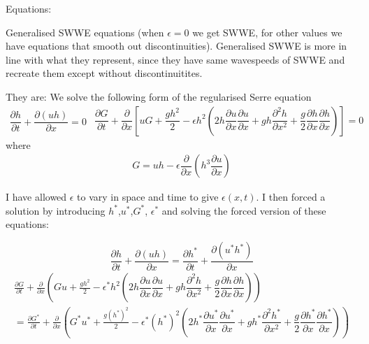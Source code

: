 \documentclass[10pt]{article}
\begin{document}
	Equations:
	
	Generalised SWWE equations (when $\epsilon = 0$ we get SWWE, for other values we have equations that smooth out discontinuities). Generalised SWWE is more in line with what they represent, since they have same wavespeeds of SWWE and recreate them except without discontinuitites.
	
	They are:
We solve the following form of the regularised Serre equation
\begin{subequations}
	\begin{gather}
	\dfrac{\partial h}{\partial t} + \dfrac{\partial (uh)}{\partial x} = 0
	\label{eq:gSV_Ga}
	\end{gather}
	\begin{gather}
	\dfrac{\partial G}{\partial t} + \dfrac{\partial }{\partial x} \left[ uG + \dfrac{gh^2}{2} - \epsilon h^2\left ( 2 h \dfrac{\partial u}{\partial x} \dfrac{\partial u}{\partial x} + gh \dfrac{\partial^2h}{\partial x^2} +\dfrac{g}{2} \dfrac{\partial h}{\partial x}\dfrac{\partial h}{\partial x} \right ) \right]= 0
	\label{eq:gSV_Gb}
	\end{gather}
	\label{eq:gSV_G}
\end{subequations}
where
\begin{gather*}
G = uh - \epsilon \dfrac{\partial }{\partial x} \left (h^3 \dfrac{\partial u}{\partial x} \right )
\end{gather*}

I have allowed $\epsilon$ to vary in space and time to give $\epsilon(x,t)$. I then forced a solution by introducing $h^*$,$u^*$,$G^*$, $\epsilon^*$ and solving the forced version of these equations:
	
	\[
	\frac{\partial h}{\partial t} + \frac{\partial (uh)}{\partial x} = \frac{\partial h^*}{\partial t} + \frac{\partial (u^*h^*)}{\partial x}
	\]
	\begin{multline}	
	\frac{\partial G}{\partial t} + \frac{\partial }{\partial x} \left ( Gu + \frac{gh^2}{2}  - \epsilon^* h^2\left ( 2 h \dfrac{\partial u}{\partial x} \dfrac{\partial u}{\partial x} + gh \dfrac{\partial^2h}{\partial x^2} +\dfrac{g}{2} \dfrac{\partial h}{\partial x}\dfrac{\partial h}{\partial x} \right ) \right )\\ = \frac{\partial G^*}{\partial t} + \frac{\partial }{\partial x} \left ( G^*u^* + \frac{g(h^*)^2}{2} - \epsilon^* (h^*)^2\left ( 2 h^* \dfrac{\partial u^*}{\partial x} \dfrac{\partial u^*}{\partial x} + gh^* \dfrac{\partial^2h^*}{\partial x^2} +\dfrac{g}{2} \dfrac{\partial h^*}{\partial x}\dfrac{\partial h^*}{\partial x} \right ) \right )
	\end{multline}
	
\end{document}
